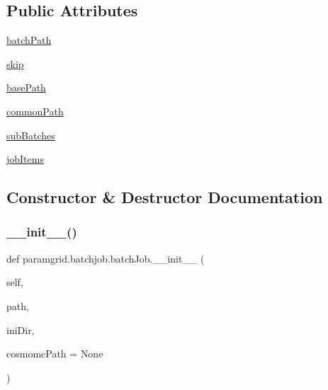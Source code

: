 \subsection*{Public Attributes}
\begin{DoxyCompactItemize}
\item 
\mbox{\hyperlink{classparamgrid_1_1batchjob_1_1batchJob_a8df467de78762f3e6c567912f4669c4f}{batch\+Path}}
\item 
\mbox{\hyperlink{classparamgrid_1_1batchjob_1_1batchJob_abb20adbebddd78e96923567994800b09}{skip}}
\item 
\mbox{\hyperlink{classparamgrid_1_1batchjob_1_1batchJob_ac98c86c7648ff3df92cee8ee418499a9}{base\+Path}}
\item 
\mbox{\hyperlink{classparamgrid_1_1batchjob_1_1batchJob_aa8061da597cd4b7dd0866434369e235f}{common\+Path}}
\item 
\mbox{\hyperlink{classparamgrid_1_1batchjob_1_1batchJob_a39f0c10b486041bb9ccf5f2a20027e12}{sub\+Batches}}
\item 
\mbox{\hyperlink{classparamgrid_1_1batchjob_1_1batchJob_a69b788da22154b4c3422d5a1d66c35eb}{job\+Items}}
\end{DoxyCompactItemize}


\subsection{Constructor \& Destructor Documentation}
\mbox{\label{classparamgrid_1_1batchjob_1_1batchJob_a83638ae47c7522ac0b8d4ee9e1007b78}} 
\subsubsection{\texorpdfstring{\+\_\+\+\_\+init\+\_\+\+\_\+()}{\_\_init\_\_()}}
{\footnotesize\ttfamily def paramgrid.\+batchjob.\+batch\+Job.\+\_\+\+\_\+init\+\_\+\+\_\+ (\begin{DoxyParamCaption}\item[{}]{self,  }\item[{}]{path,  }\item[{}]{ini\+Dir,  }\item[{}]{cosmomc\+Path = {\ttfamily None} }\end{DoxyParamCaption})}



